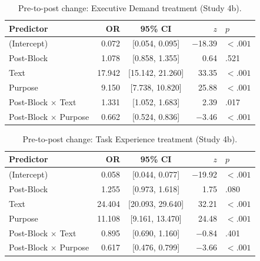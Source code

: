 \documentclass[pdflatex,sn-nature]{sn-jnl}
\begin{document}
\begin{appendices}
\begin{table}[htbp]
\caption{Pre-to-post change: Executive Demand treatment (Study 4b).}
\label{tab:S17}
\begin{tabular*}{\textwidth}{@{\extracolsep{\fill}}lrcrl@{}}
\toprule
Predictor & OR & 95\% CI & $z$ & $p$ \\
\midrule
(Intercept)                & 0.072 & [0.054, 0.095] & $-$18.39 & $<.001$ \\
Post-Block                 & 1.078 & [0.858, 1.355] & 0.64    & .521    \\
Text                       & 17.942& [15.142, 21.260]& 33.35  & $<.001$ \\
Purpose                    & 9.150 & [7.738, 10.820] & 25.88  & $<.001$ \\
Post-Block $\times$ Text   & 1.331 & [1.052, 1.683] & 2.39    & .017    \\
Post-Block $\times$ Purpose& 0.662 & [0.524, 0.836] & $-$3.46  & $<.001$ \\
\bottomrule
\end{tabular*}
\end{table}

\begin{table}[htbp]
\caption{Pre-to-post change: Task Experience treatment (Study 4b).}
\label{tab:S18}
\begin{tabular*}{\textwidth}{@{\extracolsep{\fill}}lrcrl@{}}
\toprule
Predictor & OR & 95\% CI & $z$ & $p$ \\
\midrule
(Intercept)                & 0.058 & [0.044, 0.077] & $-$19.92 & $<.001$ \\
Post-Block                 & 1.255 & [0.973, 1.618] & 1.75    & .080    \\
Text                       & 24.404& [20.093, 29.640]& 32.21  & $<.001$ \\
Purpose                    & 11.108& [9.161, 13.470] & 24.48  & $<.001$ \\
Post-Block $\times$ Text   & 0.895 & [0.690, 1.160] & $-$0.84  & .401    \\
Post-Block $\times$ Purpose& 0.617 & [0.476, 0.799] & $-$3.66  & $<.001$ \\
\bottomrule
\end{tabular*}
\end{table}


\end{appendices}
\end{document}
